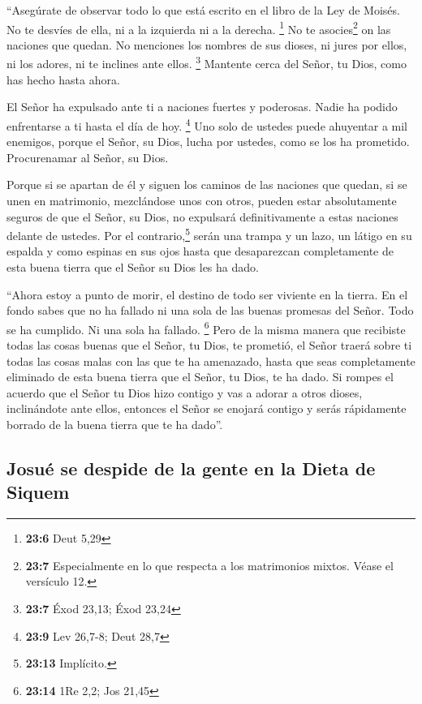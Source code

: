  ``Asegúrate de observar todo lo que está escrito en el
libro de la Ley de Moisés. No te desvíes de ella, ni a la izquierda ni a
la derecha. \footnote{\textbf{23:6} Deut 5,29}  No te
asocies\footnote{\textbf{23:7} Especialmente en lo que respecta a los
  matrimonios mixtos. Véase el versículo 12.} on las naciones que
quedan. No menciones los nombres de sus dioses, ni jures por ellos, ni
los adores, ni te inclines ante ellos. \footnote{\textbf{23:7} Éxod
  23,13; Éxod 23,24}  Mantente cerca del Señor, tu Dios,
como has hecho hasta ahora.

 El Señor ha expulsado ante ti a naciones fuertes y
poderosas. Nadie ha podido enfrentarse a ti hasta el día de hoy.
\footnote{\textbf{23:9} Lev 26,7-8; Deut 28,7}  Uno solo
de ustedes puede ahuyentar a mil enemigos, porque el Señor, su Dios,
lucha por ustedes, como se los ha prometido. 
Procurenamar al Señor, su Dios.

 Porque si se apartan de él y siguen los caminos de las
naciones que quedan, si se unen en matrimonio, mezclándose unos con
otros,  pueden estar absolutamente seguros de que el
Señor, su Dios, no expulsará definitivamente a estas naciones delante de
ustedes. Por el contrario,\footnote{\textbf{23:13} Implícito.} serán una
trampa y un lazo, un látigo en su espalda y como espinas en sus ojos
hasta que desaparezcan completamente de esta buena tierra que el Señor
su Dios les ha dado.

 ``Ahora estoy a punto de morir, el destino de todo ser
viviente en la tierra. En el fondo sabes que no ha fallado ni una sola
de las buenas promesas del Señor. Todo se ha cumplido. Ni una sola ha
fallado. \footnote{\textbf{23:14} 1Re 2,2; Jos 21,45} 
Pero de la misma manera que recibiste todas las cosas buenas que el
Señor, tu Dios, te prometió, el Señor traerá sobre ti todas las cosas
malas con las que te ha amenazado, hasta que seas completamente
eliminado de esta buena tierra que el Señor, tu Dios, te ha dado.
 Si rompes el acuerdo que el Señor tu Dios hizo contigo y
vas a adorar a otros dioses, inclinándote ante ellos, entonces el Señor
se enojará contigo y serás rápidamente borrado de la buena tierra que te
ha dado''.

\hypertarget{josuuxe9-se-despide-de-la-gente-en-la-dieta-de-siquem}{%
\subsection{Josué se despide de la gente en la Dieta de
Siquem}\label{josuuxe9-se-despide-de-la-gente-en-la-dieta-de-siquem}}


